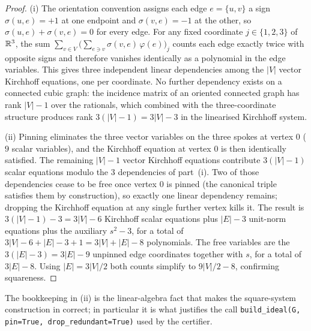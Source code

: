 \begin{proof}
(i) The orientation convention assigns each edge $e = \{u, v\}$ a
sign $\sigma(u, e) = +1$ at one endpoint and $\sigma(v, e) = -1$ at
the other, so $\sigma(u, e) + \sigma(v, e) = 0$ for every edge. For
any fixed coordinate $j \in \{1, 2, 3\}$ of $\mathbb{R}^{3}$, the sum
$\sum_{v \in V} \big( \sum_{e \ni v} \sigma(v, e)\,\varphi(e) \big)_j$
counts each edge exactly twice with opposite signs and therefore
vanishes identically as a polynomial in the edge variables. This
gives three independent linear dependencies among the $|V|$ vector
Kirchhoff equations, one per coordinate. No further dependency exists
on a connected cubic graph: the
incidence matrix of an oriented connected graph has rank $|V| - 1$
over the rationals, which combined with the three-coordinate
structure produces rank $3(|V| - 1) = 3|V| - 3$ in the linearised
Kirchhoff system.

(ii) Pinning eliminates the three vector variables on the three
spokes at vertex $0$ ($9$ scalar variables), and the Kirchhoff
equation at vertex $0$ is then identically satisfied. The remaining
$|V| - 1$ vector Kirchhoff equations contribute $3(|V| - 1)$ scalar
equations modulo the $3$ dependencies of part~(i). Two of those
dependencies cease to be free once vertex $0$ is pinned (the
canonical triple satisfies them by construction), so exactly one
linear dependency remains; dropping the Kirchhoff equation at any
single further vertex kills it. The result is $3(|V| - 1) - 3 =
3|V| - 6$ Kirchhoff scalar equations plus $|E| - 3$ unit-norm
equations plus the auxiliary $s^{2} - 3$, for a total of
$3|V| - 6 + |E| - 3 + 1 = 3|V| + |E| - 8$ polynomials. The free
variables are the $3(|E| - 3) = 3|E| - 9$ unpinned edge coordinates
together with $s$, for a total of $3|E| - 8$. Using $|E| = 3|V|/2$
both counts simplify to $9|V|/2 - 8$, confirming squareness.
\end{proof}

The bookkeeping in (ii) is the linear-algebra fact that makes the
square-system construction in 
correct; in particular it is what justifies the call
\texttt{build\_ideal(G, pin=True, drop\_redundant=True)} used by the
certifier.
